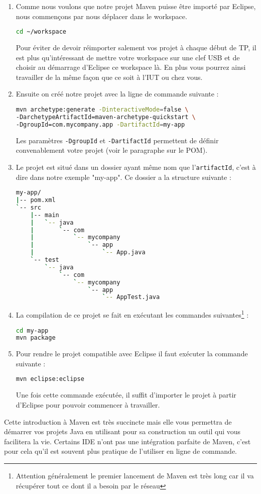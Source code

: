 \documentclass[a4paper,11pt]{article}
\begin{document}
\begin{enumerate}
  \item Comme nous voulons que notre projet Maven puisse être importé par Eclipse, nous commençons par nous déplacer dans le workspace.
  \begin{lstlisting}[language=sh]
cd ~/workspace
  \end{lstlisting}
  Pour éviter de devoir réimporter salement vos projet à chaque début de TP, il est plus qu'intéressant de mettre votre workspace 
  sur une clef USB et de choisir au démarrage d'Eclipse ce workspace là. En plus vous pourrez ainsi travailler de la même 
  façon que ce soit à l'IUT ou chez vous.
  \item Ensuite on créé notre projet avec la ligne de commande suivante :
  \begin{lstlisting}[language=sh]
mvn archetype:generate -DinteractiveMode=false \
-DarchetypeArtifactId=maven-archetype-quickstart \
-DgroupId=com.mycompany.app -DartifactId=my-app 
  \end{lstlisting}
  Les paramètres \texttt{-DgroupId} et \texttt{-DartifactId} permettent de définir convenablement votre projet (voir le paragraphe sur le POM).
  
  \item Le projet est situé dans un dossier ayant même nom que l'\texttt{artifactId}, c'est à dire dans notre exemple "my-app". 
  Ce dossier a la structure suivante :
  \begin{lstlisting}[language=sh]
my-app/
|-- pom.xml
`-- src
    |-- main
    |   `-- java
    |       `-- com
    |           `-- mycompany
    |               `-- app
    |                   `-- App.java
    `-- test
        `-- java
            `-- com
                `-- mycompany
                    `-- app
                        `-- AppTest.java
  \end{lstlisting}
  \item La compilation de ce projet se fait en exécutant les commandes suivantes\footnote{Attention généralement le 
  premier lancement de Maven est très long car il va récupérer tout ce dont il a besoin par le réseau} :
  \begin{lstlisting}[language=sh]
cd my-app
mvn package
  \end{lstlisting}
  \item Pour rendre le projet compatible avec Eclipse il faut exécuter la commande suivante : 
  \begin{lstlisting}[language=sh]
mvn eclipse:eclipse
  \end{lstlisting}
  Une fois cette commande exécutée, il suffit d'importer le projet à partir d'Eclipse pour pouvoir commencer à travailler.
\end{enumerate}
Cette introduction à Maven est très succincte mais elle vous permettra de démarrer vos projets Java en utilisant pour sa 
construction un outil qui vous facilitera la vie. Certains IDE n'ont pas une intégration parfaite de Maven, c'est pour 
cela qu'il est souvent plus pratique de l'utiliser en ligne de commande.
\end{document}
